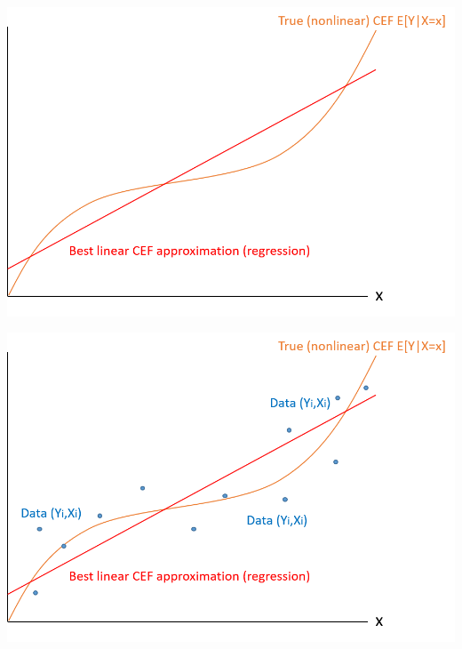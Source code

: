 \documentclass[11pt,english,handout]{beamer}
\begin{document}
\begin{frame}
	
	\begin{center}
		\hspace{0.7cm}\includegraphics[scale=0.7]{ols2.png}
	\end{center}
	
\end{frame}

\begin{frame}
	
	\begin{center}
		\hspace{0.7cm}\includegraphics[scale=0.7]{ols3.png}
	\end{center}
	
\end{frame}
\end{document}
